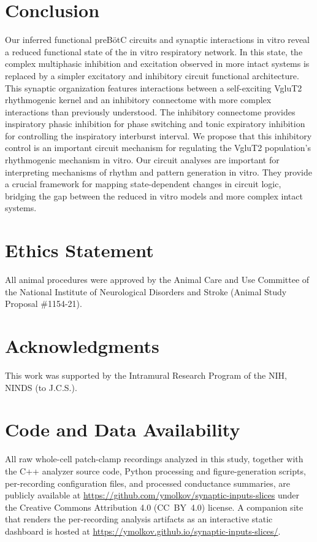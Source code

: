 \documentclass[
]{article}
\begin{document}
\section{Conclusion}

Our inferred functional preBötC circuits and synaptic interactions in vitro reveal a reduced functional state of the in vitro respiratory network. In this state, the complex multiphasic inhibition and excitation observed in more intact systems is replaced by a simpler excitatory and inhibitory circuit functional architecture. This synaptic organization features interactions between a self-exciting VgluT2 rhythmogenic kernel and an inhibitory connectome with more complex interactions than previously understood. The inhibitory connectome provides inspiratory phasic inhibition for phase switching and tonic expiratory inhibition for controlling the inspiratory interburst interval. We propose that this inhibitory control is an important circuit mechanism for regulating the VgluT2 population's rhythmogenic mechanism in vitro. Our circuit analyses are important for interpreting mechanisms of rhythm and pattern generation in vitro. They provide a crucial framework for mapping state-dependent changes in circuit logic, bridging the gap between the reduced in vitro models and more complex intact systems.

\section*{Ethics Statement}

All animal procedures were approved by the Animal Care and Use Committee of the National Institute of Neurological Disorders and Stroke (Animal Study Proposal \#1154-21).

\section*{Acknowledgments}

This work was supported by the Intramural Research Program of the NIH, NINDS (to J.C.S.).

\section*{Code and Data Availability}

All raw whole-cell patch-clamp recordings analyzed in this study, together with the C++ analyzer source code, Python processing and figure-generation scripts, per-recording configuration files, and processed conductance summaries, are publicly available at \url{https://github.com/ymolkov/synaptic-inputs-slices} under the Creative Commons Attribution 4.0 (CC~BY~4.0) license. A companion site that renders the per-recording analysis artifacts as an interactive static dashboard is hosted at \url{https://ymolkov.github.io/synaptic-inputs-slices/}.


\clearpage
\appendix

\end{document}
